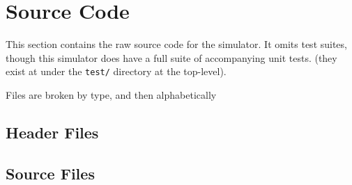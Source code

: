\documentclass{article}
\begin{document}

\clearpage

\section{Source Code}

This section contains the raw source code for the simulator. It omits test
suites, though this simulator does have a full suite of accompanying unit tests.
(they exist at under the \texttt{test/} directory at the top-level).

Files are broken by type, and then alphabetically

\subsection{Header Files}


\clearpage

\clearpage

\clearpage

\clearpage

\clearpage

\clearpage

\clearpage

\clearpage

\clearpage

\clearpage

\clearpage

\subsection{Source Files}
\end{document}

